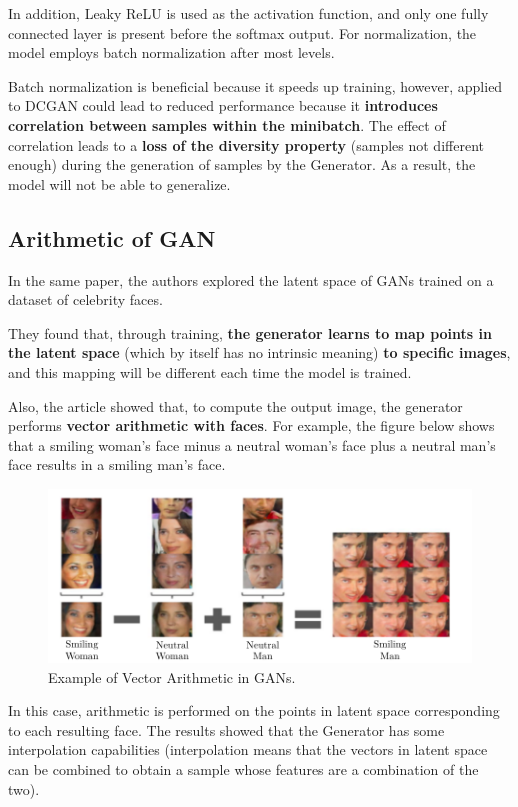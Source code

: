 In addition, Leaky ReLU is used as the activation function, and only one fully connected layer is present before the softmax output. For normalization, the model employs batch normalization after most levels.

Batch normalization is beneficial because it speeds up training, however, applied to DCGAN could lead to reduced performance because it \textbf{introduces correlation between samples within the minibatch}. The effect of correlation leads to a \textbf{loss of the diversity property} (samples not different enough) during the generation of samples by the Generator. As a result, the model will not be able to generalize.

\subsection{Arithmetic of GAN}

In the same paper, the authors explored the latent space of GANs trained on a dataset of celebrity faces. 

They found that, through training, \textbf{the generator learns to map points in the latent space} (which by itself has no intrinsic meaning) \textbf{to specific images}, and this mapping will be different each time the model is trained.

Also, the article showed that, to compute the output image, the generator performs \textbf{vector arithmetic with faces}. For example, the figure below shows that a smiling woman's face minus a neutral woman's face plus a neutral man's face results in a smiling man's face.

\begin{figure}[!htbp]
    \centering
    \includegraphics[width=0.8\linewidth]{tikz/chapter9 - Arithmetics of GAN.pdf}
    \caption{Example of Vector Arithmetic in GANs.}
\end{figure}

In this case, arithmetic is performed on the points in latent space corresponding to each resulting face. The results showed that the Generator has some interpolation capabilities (interpolation means that the vectors in latent space can be combined to obtain a sample whose features are a combination of the two).

